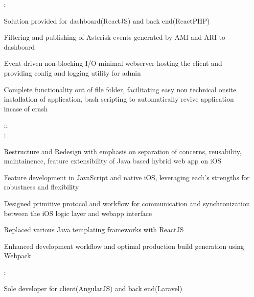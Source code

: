\documentclass[]{hemant-style}
\begin{document}
\begin{minipage}[]{\textwidth}
\begin{minipage}{\textwidth}
\begin{minipage}[t][][c]{.75\textwidth}
                            :
                            \begin{hitemize}
                                \item Solution provided for dashboard(ReactJS) and back end(ReactPHP)
                                \item Filtering and publishing of Asterisk events generated by AMI and ARI to dashboard
                                \item Event driven non-blocking I/O minimal webserver hosting the client and  providing config and logging utility for admin
                                \item Complete functionality out of file folder, facilitating easy non technical onsite installation of application, bash scripting to automatically revive  application incase of crash
                            \end{hitemize}
                            ::\\
                            :
                            \begin{hitemize}
                                \item Restructure and Redesign with emphasis on separation of concerns, reusability, maintainence, feature extensibility of Java based hybrid web app on iOS
                                \item Feature development in JavaScript and native iOS, leveraging each’s strengths for robustness and flexibility
                                \item Designed primitive protocol and workflow for communication and synchronization between the iOS logic layer and webapp interface
                                \item Replaced various Java templating frameworks with ReactJS
                                \item Enhanced development workflow and optimal production build generation using Webpack
                            \end{hitemize}
                            :
                            \begin{hitemize}
                                \item Sole developer for client(AngularJS) and back end(Laravel)

\end{hitemize}
\end{minipage}
\end{minipage}
\end{minipage}
\end{document}
